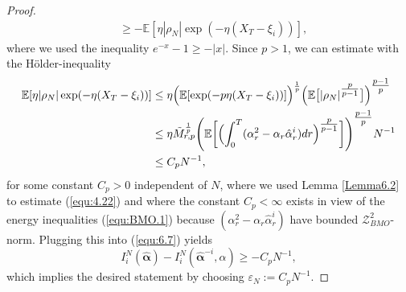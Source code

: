 \documentclass[10pt,a4paper]{article}
\newcommand{\Balpha}{\boldsymbol{\alpha}}
\newcommand{\hBalpha}{\hat{\Balpha}}
\theoremstyle{plain}
\newtheorem{Remark}[Theorem]{Remark}
\theoremstyle{definition}
\numberwithin{equation}{section}
\newcommand{\lps}[2]{{}^{#1}\!#2}
\begin{document}
\begin{proof}
\begin{align}
&\geq -\mathbb{E}[\eta|\rho_{N}|\exp(-\eta(X_{T}-\xi_{i}))] \label{equ:6.7},
\end{align}
where we used the inequality $e^{-x}-1 \geq -|x|$. Since $p>1$, we can estimate with the Hölder-inequality
\begin{align}
\mathbb{E}[\eta|\rho_{N}|\exp(-\eta(X_{T}-\xi_{i}))] &\leq \eta\Bigl(\mathbb{E}[\exp(-p\eta(X_{T}-\xi_{i}))]\Bigr)^{\frac1p}\Bigl(\mathbb{E}\bigl[|\rho_{N}|^{\tfrac{p}{p-1}}\bigr]\Bigr)^{\tfrac{p-1}{p}} \nonumber \\
&\leq \eta\tilde{M}_{r,p}^{\frac1p}\Biggl(\mathbb{E}\biggl[\Bigl(\int_{0}^{T}(\alpha_{r}^{2}-\alpha_{r}\hat{\alpha}_{r}^{i})dr\Bigr)^{\tfrac{p}{p-1}}\biggr]\Biggr)^{\tfrac{p-1}{p}}N^{-1} \label{equ:4.22} \\
&\leq C_{p}N^{-1}, \label{equ:4.23}
\end{align}
for some constant $C_{p}>0$ independent of $N$, where we used Lemma \ref{Lemma6.2} to estimate (\ref{equ:4.22}) and where the constant $C_{p}<\infty$ exists in view of the energy inequalities (\ref{equ:BMO.1}) because $(\alpha_{r}^{2}-\alpha_{r}\hat{\alpha}_{r}^{i})$ have bounded $\mathcal{Z}_{BMO}^{2}$-norm. Plugging this into (\ref{equ:6.7}) yields
\begin{equation}
I_{i}^{N}(\hBalpha) - I_{i}^{N}(\hBalpha^{-i},\alpha) \geq -C_{p}N^{-1},
\end{equation}
which implies the desired statement by choosing $\varepsilon_{N}:=C_{p}N^{-1}$.


\end{proof}

   
\end{document}
